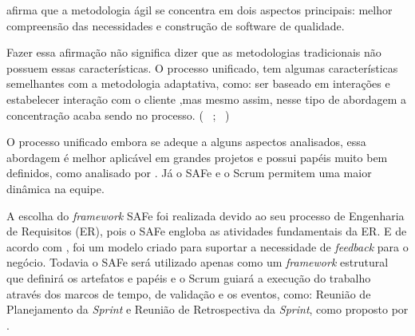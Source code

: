  afirma que a metodologia ágil se concentra em dois aspectos principais: 
melhor compreensão das necessidades e construção de software de qualidade. 

Fazer essa afirmação não significa dizer que as metodologias tradicionais não possuem essas características. O processo unificado, 
tem algumas características semelhantes com a metodologia adaptativa, como: ser baseado em interações e estabelecer interação com o cliente
,mas mesmo assim, nesse tipo de abordagem a concentração acaba sendo no processo. (~\cite{safe} ; ~\cite{vasco})

O processo unificado embora se adeque a alguns aspectos analisados, essa abordagem é melhor  aplicável 
em grandes projetos e possui papéis muito bem definidos, como analisado por . Já o SAFe e o Scrum permitem uma maior dinâmica na equipe.

A escolha do \textit{framework} SAFe foi realizada devido ao seu processo de Engenharia de Requisitos (ER), pois o SAFe engloba as atividades
fundamentais da ER. E de acordo com , foi um modelo criado para suportar a necessidade de \textit{feedback}
para o negócio. Todavia o SAFe será utilizado apenas como um \textit{framework} estrutural que definirá os artefatos e papéis e o Scrum guiará
a execução do trabalho através dos marcos de tempo, de validação e os eventos, como: Reunião de Planejamento da \textit{Sprint} e 
Reunião de Retrospectiva da \textit{Sprint}, como proposto por .

